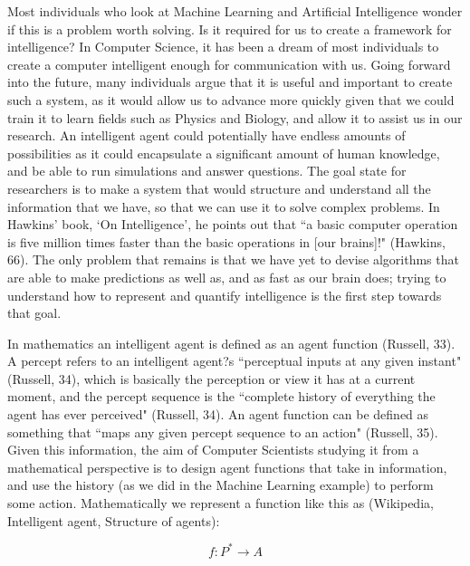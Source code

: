 \documentclass[11pt, oneside]{article}
\begin{document}
\par Most individuals who look at Machine Learning and Artificial Intelligence wonder if this is a problem worth solving. Is it required for us to create a framework for intelligence? In Computer Science, it has been a dream of most individuals to create a computer intelligent enough for communication with us. Going forward into the future, many individuals argue that it is useful and important to create such a system, as it would allow us to advance more quickly given that we could train it to learn fields such as Physics and Biology, and allow it to assist us in our research. An intelligent agent could potentially have endless amounts of possibilities as it could encapsulate a significant amount of human knowledge, and be able to run simulations and answer questions. The goal state for researchers is to make a system that would structure and understand all the information that we have, so that we can use it to solve complex problems. In Hawkins' book, `On Intelligence', he points out that ``a basic computer operation is five million times faster than the basic operations in [our brains]!" (Hawkins, 66). The only problem that remains is that we have yet to devise algorithms that are able to make predictions as well as, and as fast as our brain does; trying to understand how to represent and quantify intelligence is the first step towards that goal. 

\par In mathematics an intelligent agent is defined as an agent function (Russell, 33). A percept refers to an intelligent agent?s ``perceptual inputs at any given instant" (Russell, 34), which is basically the perception or view it has at a current moment, and the percept sequence is the ``complete history of everything the agent has ever perceived" (Russell, 34). An agent function can be defined as something that ``maps any given percept sequence to an action" (Russell, 35). Given this information, the aim of Computer Scientists studying it from a mathematical perspective is to design agent functions that take in information, and use the history (as we did in the Machine Learning example) to perform some action. Mathematically we represent a function like this as (Wikipedia, Intelligent agent, Structure of agents):

\begin{equation} \label{eu_eqn}
f\colon P^* \to A
\end{equation}
\end{document}

